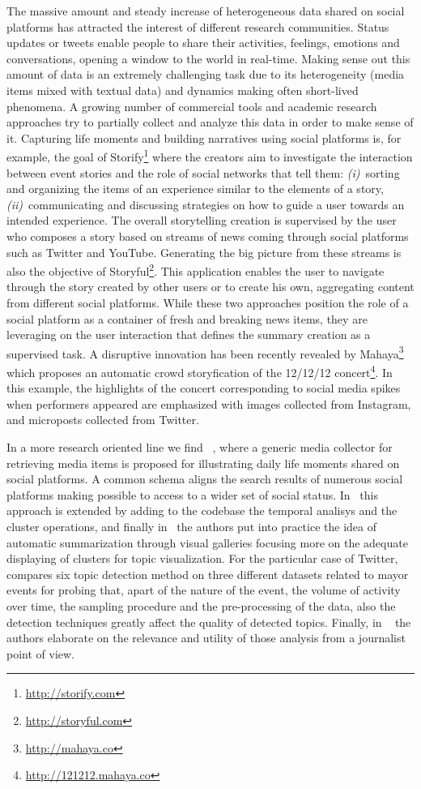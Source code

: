 \documentclass{sig-alternate}
\begin{document}
The massive amount and steady increase of heterogeneous data shared on social platforms has attracted the interest of different research communities. Status updates or tweets enable people to share their activities, feelings, emotions and conversations, opening a window to the world in real-time. Making sense out this amount of data is an extremely challenging task due to its heterogeneity (media items mixed with textual data) and dynamics making often short-lived phenomena. A growing number of commercial tools and academic research approaches try to partially collect and analyze this data in order to make sense of it. Capturing life moments and building narratives using social platforms is, for example, the goal of Storify\footnote{\url{http://storify.com}} where the creators aim to investigate the interaction between event stories and the role of social networks that tell them: \textit{(i)}~sorting and organizing the items of an experience similar to the elements of a story, \textit{(ii)}~communicating and discussing strategies on how to guide a user towards an intended experience. The overall storytelling creation is supervised by the user who composes a story based on streams of news coming through social platforms such as Twitter and YouTube. Generating the big picture from these streams is also the objective of Storyful\footnote{\url{http://storyful.com}}. This application enables the user to navigate through the story created by other users or to create his own, aggregating content from different social platforms. While these two approaches position the role of a social platform as a container of fresh and breaking news items, they are leveraging on the user interaction that defines the summary creation as a supervised task. A disruptive innovation has been recently revealed by Mahaya\footnote{\url{http://mahaya.co}} which proposes an automatic crowd storyfication of the 12/12/12 concert\footnote{\url{http://121212.mahaya.co}}. In this example, the highlights of the concert corresponding to social media spikes when performers appeared are emphasized with images collected from Instagram, and microposts collected from Twitter. 

In a more research oriented line we find ~\cite{Rizzo2012}, where a generic media collector for retrieving media items is proposed for illustrating daily life moments shared on social platforms. A common schema aligns the search results of numerous social platforms making possible to access to a wider set of social status. In~\cite{Milicic2013} this approach is extended by adding to the codebase the temporal analisys and the cluster operations, and finally in~\cite{Milicic2013b} the authors put into practice the idea of automatic summarization through visual galleries focusing more on the adequate displaying of clusters for topic visualization. For the particular case of Twitter, ~\cite{Aiello} compares six topic detection method on three different datasets related to mayor events for probing that, apart of the nature of the event, the volume of activity over time, the sampling procedure and the pre-processing of the data, also the detection techniques greatly affect the quality of detected topics. Finally, in ~\cite{Schifferes} the authors elaborate on the relevance and utility of those analysis from a journalist point of view.
\end{document}
